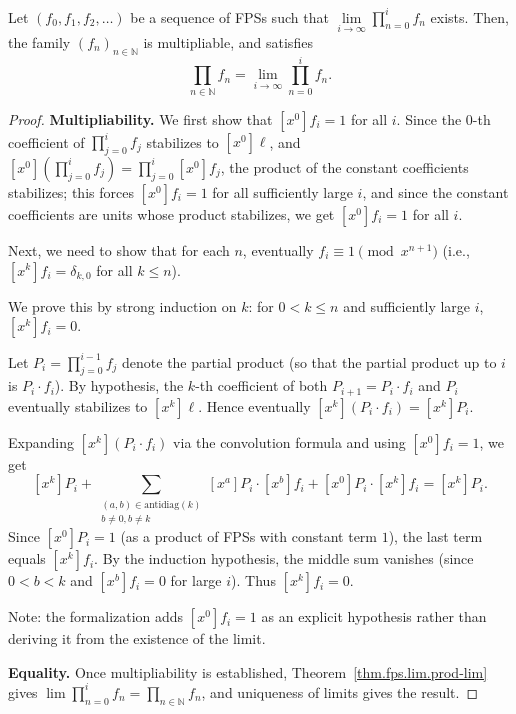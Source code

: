 \begin{theorem}
\label{thm.fps.lim.prod-lim-conv}
\leantarget
\leanok
Let $\left(  f_{0},f_{1},f_{2},\ldots\right)
$ be a sequence of FPSs such that $\lim\limits_{i\rightarrow\infty}\prod
_{n=0}^{i}f_{n}$ exists. Then, the family $\left(  f_{n}\right)
_{n\in\mathbb{N}}$ is multipliable, and satisfies%
\[
\prod_{n\in\mathbb{N}}f_{n}=\lim\limits_{i\rightarrow\infty}\prod_{n=0}%
^{i}f_{n}.
\]
\end{theorem}

\begin{proof}
\leanok
\textbf{Multipliability.} We first show that $[x^0]f_i = 1$ for all $i$.
Since the $0$-th coefficient of $\prod_{j=0}^{i} f_j$ stabilizes to
$[x^0]\ell$, and $[x^0](\prod_{j=0}^{i} f_j) = \prod_{j=0}^{i} [x^0]f_j$,
the product of the constant coefficients stabilizes; this forces $[x^0]f_i = 1$
for all sufficiently large $i$, and since the constant coefficients are units
whose product stabilizes, we get $[x^0]f_i = 1$ for all $i$.

Next, we need to show that for each $n$, eventually $f_i \equiv 1 \pmod{x^{n+1}}$
(i.e., $[x^k]f_i = \delta_{k,0}$ for all $k \leq n$).

We prove this by strong induction on $k$: for $0 < k \leq n$ and sufficiently
large $i$, $[x^k]f_i = 0$.

Let $P_i = \prod_{j=0}^{i-1} f_j$ denote the partial product (so that the
partial product up to $i$ is $P_i \cdot f_i$). By hypothesis, the $k$-th
coefficient of both $P_{i+1} = P_i \cdot f_i$ and $P_i$ eventually stabilizes
to $[x^k]\ell$. Hence eventually
$[x^k](P_i \cdot f_i) = [x^k]P_i$.

Expanding $[x^k](P_i \cdot f_i)$ via the convolution formula and using
$[x^0]f_i = 1$, we get
\[
[x^k]P_i + \sum_{\substack{(a,b) \in \mathrm{antidiag}(k) \\ b \neq 0, b \neq k}}
[x^a]P_i \cdot [x^b]f_i + [x^0]P_i \cdot [x^k]f_i = [x^k]P_i.
\]
Since $[x^0]P_i = 1$ (as a product of FPSs with constant term $1$), the last
term equals $[x^k]f_i$. By the induction hypothesis, the middle sum vanishes
(since $0 < b < k$ and $[x^b]f_i = 0$ for large $i$). Thus $[x^k]f_i = 0$.

Note: the formalization adds $[x^0]f_i = 1$ as an explicit hypothesis
rather than deriving it from the existence of the limit.

\textbf{Equality.} Once multipliability is established, Theorem~\ref{thm.fps.lim.prod-lim}
gives $\lim \prod_{n=0}^{i} f_n = \prod_{n \in \mathbb{N}} f_n$, and
uniqueness of limits gives the result.
\end{proof}
